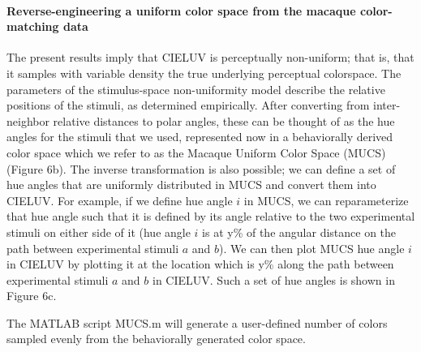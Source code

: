\paragraph{Reverse-engineering a uniform color space from the macaque color-matching data}

The present results imply that CIELUV is perceptually non-uniform; that is, that it samples with variable density the true underlying perceptual colorspace. 
The parameters of the stimulus-space non-uniformity model describe the relative positions of the stimuli, as determined empirically. 
After converting from inter-neighbor relative distances to polar angles, these can be thought of as the hue angles for the stimuli that we used, represented now in a behaviorally derived color space which we refer to as the Macaque Uniform Color Space (MUCS) (Figure 6b). 
The inverse transformation is also possible; we can define a set of hue angles that are uniformly distributed in MUCS and convert them into CIELUV. 
For example, if we define hue angle $i$ in MUCS, we can reparameterize that hue angle such that it is defined by its angle relative to the two experimental stimuli on either side of it (hue angle $i$ is at y\% of the angular distance on the path between experimental stimuli $a$ and $b$). 
We can then plot MUCS hue angle $i$ in CIELUV by plotting it at the location which is y\% along the path between experimental stimuli $a$ and $b$ in CIELUV. 
Such a set of hue angles is shown in Figure 6c. 

The MATLAB script MUCS.m will generate a user-defined number of colors sampled evenly from the behaviorally generated color space.
